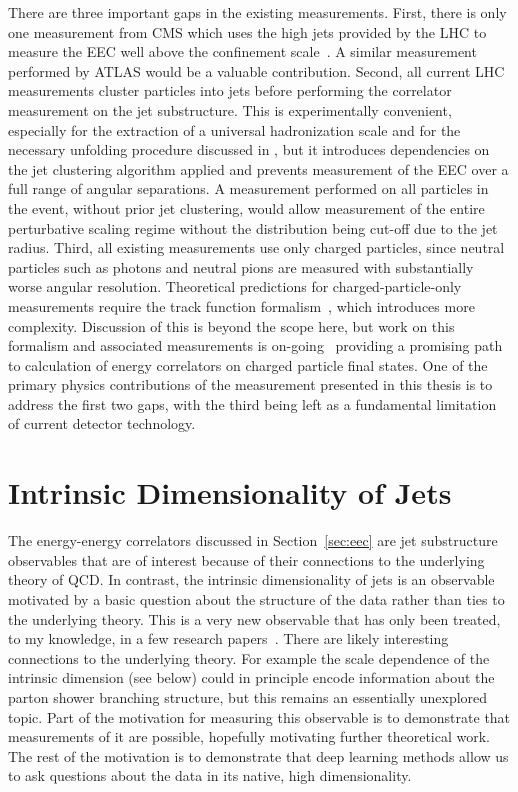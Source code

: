 There are three important gaps in the existing measurements.
First, there is only one measurement from CMS which uses the high \pt jets provided by the LHC to measure the EEC well above the confinement scale~\cite{CMS:2024mlf}.
A similar measurement performed by ATLAS would be a valuable contribution.
Second, all current LHC measurements cluster particles into jets before performing the correlator measurement on the jet substructure.
This is experimentally convenient, especially for the extraction of a universal hadronization scale and for the necessary unfolding procedure discussed in , but it introduces dependencies on the jet clustering algorithm applied and prevents measurement of the EEC over a full range of angular separations.
A measurement performed on all particles in the event, without prior jet clustering, would allow measurement of the entire perturbative scaling regime without the distribution being cut-off due to the jet radius.
Third, all existing measurements use only charged particles, since neutral particles such as photons and neutral pions are measured with substantially worse angular resolution.
Theoretical predictions for charged-particle-only measurements require the track function formalism~\cite{Chang:2013rca, Chang:2013iba}, which introduces more complexity.
Discussion of this is beyond the scope here, but work on this formalism and associated measurements is on-going~\cite{ATLAS:2025qtv} providing a promising path to calculation of energy correlators on charged particle final states.
One of the primary physics contributions of the measurement presented in this thesis is to address the first two gaps, with the third being left as a fundamental limitation of current detector technology.

\section{Intrinsic Dimensionality of Jets}
\label{sec:id}

The energy-energy correlators discussed in Section~\ref{sec:eec} are jet substructure observables that are of interest because of their connections to the underlying theory of QCD.
In contrast, the intrinsic dimensionality of jets is an observable motivated by a basic question about the structure of the data rather than ties to the underlying theory.
This is a very new observable that has only been treated, to my knowledge, in a few research papers~\cite{Komiske:2019fks, DAgnolo:2025qqr}.
There are likely interesting connections to the underlying theory.
For example the scale dependence of the intrinsic dimension (see below) could in principle encode information about the parton shower branching structure, but this remains an essentially unexplored topic.
Part of the motivation for measuring this observable is to demonstrate that measurements of it are possible, hopefully motivating further theoretical work.
The rest of the motivation is to demonstrate that deep learning methods allow us to ask questions about the data in its native, high dimensionality.

